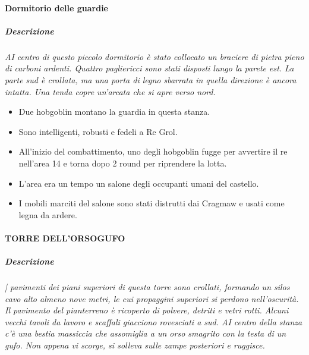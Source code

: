 \documentclass{article}
\begin{document}
\paragraph{Dormitorio delle guardie}
    \subparagraph{Descrizione} \textit{AI centro di questo piccolo dormitorio è stato collocato un
    braciere di pietra pieno di carboni ardenti. Quattro pagliericci
    sono stati disposti lungo la parete est. La parte sud è crollata,
    ma una porta di legno sbarrata in quella direzione è ancora
    intatta. Una tenda copre un’arcata che si apre verso nord.}
    \begin{itemize}
        \item Due hobgoblin montano la guardia in questa stanza.
        \item Sono intelligenti, robusti e fedeli a Re Grol.
        \item All'inizio del combattimento, uno degli hobgoblin fugge per avvertire il re nell'area 14 e torna dopo 2 round per riprendere la lotta.
        \item L'area era un tempo un salone degli occupanti umani del castello.
        \item I mobili marciti del salone sono stati distrutti dai Cragmaw e usati come legna da ardere.
    \end{itemize}
\paragraph{TORRE DELL'ORSOGUFO}
    \subparagraph{Descrizione}
             \textit{ | pavimenti dei piani superiori di questa torre sono crollati,
    formando un silos cavo alto almeno nove metri, le cui
    propaggini superiori si perdono nell'oscurità. Il pavimento del
    pianterreno è ricoperto di polvere, detriti e vetri rotti. Alcuni
    vecchi tavoli da lavoro e scaffali giacciono rovesciati a sud. AI
    centro della stanza c’è una bestia massiccia che assomiglia
    a un orso smagrito con la testa di un gufo. Non appena vi
    scorge, si solleva sulle zampe posteriori e ruggisce.}
\end{document}
